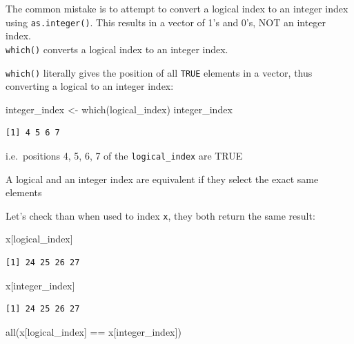 \documentclass[
]{book}
\makeatletter
\newenvironment{Shaded}{\begin{snugshade}}{\end{snugshade}}
\newcommand{\FunctionTok}[1]{\textcolor[rgb]{0.00,0.00,0.00}{#1}}
\newcommand{\NormalTok}[1]{#1}
\newcommand{\OtherTok}[1]{\textcolor[rgb]{0.56,0.35,0.01}{#1}}
\newcommand{\SpecialCharTok}[1]{\textcolor[rgb]{0.00,0.00,0.00}{#1}}
\newenvironment{kframe}{%
\medskip{}
\setlength{\fboxsep}{.8em}
 \def\at@end@of@kframe{}%
 \ifinner\ifhmode%
  \def\at@end@of@kframe{\end{minipage}}%
  \begin{minipage}{\columnwidth}%
 \fi\fi%
 \def\FrameCommand##1{\hskip\@totalleftmargin \hskip-\fboxsep
 \colorbox{shadecolor}{##1}\hskip-\fboxsep
     \hskip-\linewidth \hskip-\@totalleftmargin \hskip\columnwidth}%
 \MakeFramed {\advance\hsize-\width
   \@totalleftmargin\z@ \linewidth\hsize
   \@setminipage}}%
 {\par\unskip\endMakeFramed%
 \at@end@of@kframe}
\newenvironment{rmdblock}[1]
  {
  \begin{itemize}
  \renewcommand{\labelitemi}{
    \raisebox{-.7\height}[0pt][0pt]{
      {\setkeys{Gin}{width=3em,keepaspectratio}\texttt{[image: images/\#1]}}
    }
  }
  \setlength{\fboxsep}{1em}
  \begin{kframe}
  \item
  }
  {
  \end{kframe}
  \end{itemize}
  }
\newenvironment{note}
  {\begin{rmdblock}{note}}
  {\end{rmdblock}}
\makeatother
\begin{document}
\begin{Warning}
The common mistake is to attempt to convert a logical index to an
integer index using \texttt{as.integer()}. This results in a vector of
1's and 0's, NOT an integer index.\\
\texttt{which()} converts a logical index to an integer index.
\end{Warning}

\texttt{which()} literally gives the position of all \texttt{TRUE} elements in a vector, thus converting a logical to an integer index:

\begin{Shaded}
\begin{Highlighting}[]
\NormalTok{integer\_index }\OtherTok{\textless{}{-}} \FunctionTok{which}\NormalTok{(logical\_index)}
\NormalTok{integer\_index}
\end{Highlighting}
\end{Shaded}

\begin{verbatim}
[1] 4 5 6 7
\end{verbatim}

i.e.~positions 4, 5, 6, 7 of the \texttt{logical\_index} are TRUE

\begin{note}
A logical and an integer index are equivalent if they select the exact
same elements
\end{note}

Let's check than when used to index \texttt{x}, they both return the same result:

\begin{Shaded}
\begin{Highlighting}[]
\NormalTok{x[logical\_index]}
\end{Highlighting}
\end{Shaded}

\begin{verbatim}
[1] 24 25 26 27
\end{verbatim}

\begin{Shaded}
\begin{Highlighting}[]
\NormalTok{x[integer\_index]}
\end{Highlighting}
\end{Shaded}

\begin{verbatim}
[1] 24 25 26 27
\end{verbatim}

\begin{Shaded}
\begin{Highlighting}[]
\FunctionTok{all}\NormalTok{(x[logical\_index] }\SpecialCharTok{==}\NormalTok{ x[integer\_index])}
\end{Highlighting}
\end{Shaded}
\end{document}
